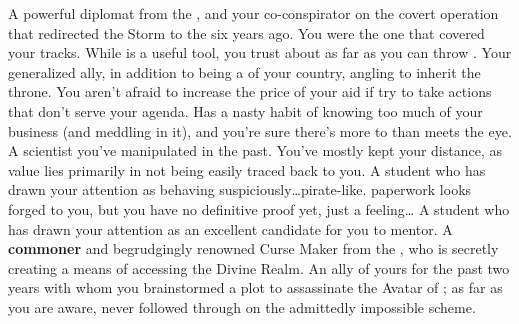 \documentclass[char]{GL2020}
\begin{document}
\begin{contacts}
    \contact{\cDiplomat{}} A powerful diplomat from the \pTech{}, and your co-conspirator on the covert operation that redirected the Storm to the \pShip{} six years ago. You were the one that covered your tracks. While \cDiplomat{\they} is a useful tool, you trust \cDiplomat{\them} about as far as you can throw \cDiplomat{\them}.
    \contact{\cPrince{}} Your generalized ally, in addition to being a \cPrince{\Heir} of your country, angling to inherit the throne. You aren’t afraid to increase the price of your aid if \cPrince{\they} try to take actions that don’t serve your agenda.
    \contact{\cInterpol{}} Has a nasty habit of knowing too much of your business (and meddling in it), and you're sure there's more to \cInterpol{\them} than meets the eye.
    \contact{\cHeadScientist{}} A scientist you've manipulated in the past. You've mostly kept your distance, as \cHeadScientist{\their} value lies primarily in \cHeadScientist{\them} not being easily traced back to you.
    \contact{\cPirateChild{}} A student who has drawn your attention as behaving suspiciously\ldots pirate-like. \cPirateChild{\Their} paperwork looks forged to you, but you have no definitive proof yet, just a feeling\ldots
     \contact{\cLibAssist{}} A student who has drawn your attention as an excellent candidate for you to mentor.
    \contact{\cCurse{}} A \textbf{commoner} and begrudgingly renowned Curse Maker from the \pFarm{}, who is secretly creating a means of accessing the Divine Realm.
    \contact{\cAntiChup{}} An ally of yours for the past two years with whom you brainstormed a plot to assassinate the Avatar of \cEbb{}; as far as you are aware, \cAntiChup{\they} never followed through on the admittedly impossible scheme.

\end{contacts}
\end{document}
